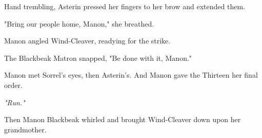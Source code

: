 Hand trembling, Asterin pressed her fingers to her brow and extended them.

"Bring our people home, Manon," she breathed.

Manon angled Wind-Cleaver, readying for the strike.

The Blackbeak Matron snapped, "Be done with it, Manon."

Manon met Sorrel's eyes, then Asterin's.
And Manon gave the Thirteen her final order.

\emph{"Run."}

Then Manon Blackbeak whirled and brought Wind-Cleaver down upon her grandmother.
